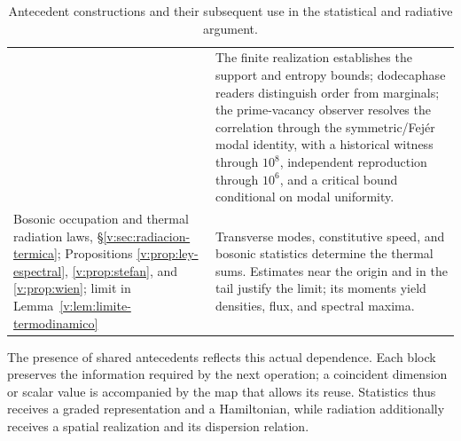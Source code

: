 \begin{table}[H]
\begin{tabularx}{\textwidth}{@{}>{\raggedright\arraybackslash}p{}>{\raggedright\arraybackslash}X@{}}
& The finite realization establishes the support and entropy bounds;
dodecaphase readers distinguish order from marginals; the prime-vacancy
observer resolves the correlation through the symmetric/Fejér modal
identity, with a historical witness through \(10^8\), independent
reproduction through \(10^6\), and a critical bound conditional on modal
uniformity. \\
Bosonic occupation and thermal radiation laws,
§\ref{v:sec:radiacion-termica}; Propositions
\ref{v:prop:ley-espectral}, \ref{v:prop:stefan}, and \ref{v:prop:wien};
limit in Lemma~\ref{v:lem:limite-termodinamico}
& Transverse modes, constitutive speed, and bosonic statistics determine
the thermal sums. Estimates near the origin and in the tail justify
the limit; its moments yield densities, flux, and spectral maxima. \\
\bottomrule
\end{tabularx}
\caption{Antecedent constructions and their subsequent use in the
statistical and radiative argument.}
\label{v:tab:mapa-demostrativo}
\end{table}

The presence of shared antecedents reflects this actual dependence.
Each block preserves the information required by the next operation;
a coincident dimension or scalar value is accompanied by the map that
allows its reuse. Statistics thus receives a graded representation and
a Hamiltonian, while radiation additionally receives a spatial
realization and its dispersion relation.

